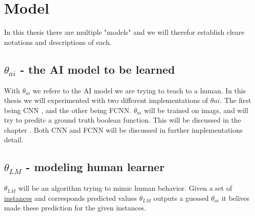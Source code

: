 \chapter{Model}

In this thesis there are multiple "models" and we will therefor establish cleare notations and descriptions of 
each.

\section{$\theta_{ai}$ - the AI model to be learned}

With $\theta_{ai}$ we refere to the AI model we are trying to teach to a human. 
In this thesis we will experimented with two different implementations of $\theta{ai}$. 
The first being \gls{CNN} \cite{CNN:deeplearning}, and the other being \gls{FCNN}.
$\theta_{ai}$ will be trained on imags, and will try to preditc a ground truth boolean function. 
This will be discussed in the chapter . Both \gls{CNN} and \gls{FCNN} will be discussed in further implementations detail.

\section{$\theta_{LM}$ - modeling human learner}
$\theta_{LM}$ will be an algorithm trying to mimic human behavior. Given a set of \hyperref[InstanceDescription]{instances} and corresponds predicted values $\theta_{LM}$ 
outputs a guessed $\theta_{ai}$ it belives made these prediction for the given instances.